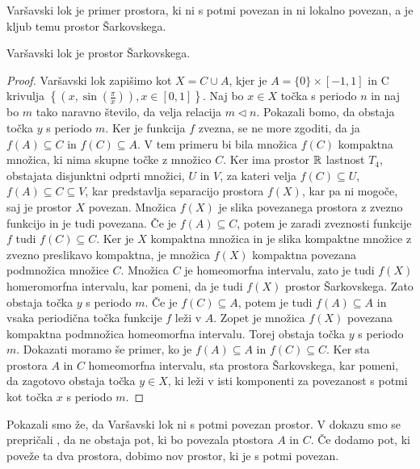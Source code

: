 \documentclass[../TG_magistrsko_delo_sections.tex]{subfiles}
\begin{document}
Varšavski lok je primer prostora, ki ni s potmi povezan in ni lokalno povezan, a je kljub temu prostor Šarkovskega.


\begin{trditev}
Varšavski lok je prostor Šarkovskega.
\end{trditev}
\begin{proof}
Varšavski lok zapišimo kot $X = C \cup A$, kjer je $A= \{0\} \times [-1, 1]$ in C krivulja $\left\{\left(x, \sin\left(\frac{\pi}{x}\right)\right), x\in [0, 1]\right\}$. Naj bo $x \in X$ točka s periodo $n$ in naj bo $m$ tako naravno število, da velja relacija $m \triangleleft n$. Pokazali bomo, da obstaja točka $y$ s periodo $m$. Ker je funkcija $f$ zvezna, se ne more zgoditi, da ja $f(A) \subseteq C$ in $f(C) \subseteq A$. V tem primeru bi bila množica $f(C)$ kompaktna množica, ki nima skupne točke z množico $C$. Ker ima prostor $\mathbb R$ lastnost $T_4$, obstajata disjunktni odprti množici, $U$ in $V$, za kateri velja $f(C) \subseteq U$, $f(A) \subseteq C \subseteq V$, kar predstavlja separacijo prostora $f(X)$, kar pa ni mogoče, saj je prostor $X$ povezan. Množica $f(X)$ je slika povezanega prostora z zvezno funkcijo in je tudi povezana. Če je $f(A) \subseteq C$, potem je zaradi zveznosti funkcije $f$ tudi $f(C) \subseteq C$. Ker je $X$ kompaktna množica in je slika kompaktne množice z zvezno preslikavo kompaktna, je množica $f(X)$ kompaktna povezana podmnožica množice $C$. Množica $C$ je homeomorfna intervalu, zato je tudi $f(X)$ homeromorfna intervalu, kar pomeni, da je tudi $f(X)$ prostor Šarkovskega. Zato obstaja točka $y$ s periodo $m$. Če je $f (C) \subseteq A $, potem je tudi $f (A) \subseteq A $ in vsaka periodična točka funkcije $f$ leži v $A$.  Zopet je množica $f(X)$ povezana kompaktna podmnožica homeomorfna intervalu. Torej obstaja točka $y$ s periodo $m$. 
Dokazati moramo še primer, ko je $f (A) \subseteq A $ in $f (C) \subseteq C $. Ker sta prostora $A$ in $C$ homeomorfna intervalu, sta prostora Šarkovskega, kar pomeni, da zagotovo obstaja točka $y \in X$, ki leži v isti komponenti za povezanost s potmi kot točka $x$ s periodo $m$.
\end{proof}

Pokazali smo že, da Varšavski lok ni s potmi povezan prostor. V dokazu smo se prepričali , da ne obstaja pot, ki bo povezala ptostora $A$ in $C$. Če dodamo pot, ki poveže ta dva prostora, dobimo nov prostor, ki je s potmi povezan.
\end{document}
